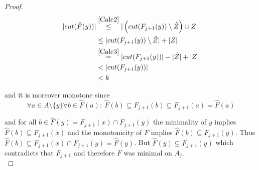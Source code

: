 \begin{proof}
    \begin{align*}
        |cut(\hat{F}(y))| &\overset{\cref*{Calc2}}{\leq} |\left(cut(F_{j+1}(y))\setminus \hat{Z}\right) \cup Z|\\
        &\leq |cut(F_{j+1}(y)) \setminus \hat{Z}| + |Z|\\
        &\overset{\cref*{Calc3}}{=} |cut(F_{j+1}(y))| - |\hat{Z}| + |Z|\\
        &< |cut(F_{j+1}(y))|\\
        &< k
    \end{align*}

    and it is moreover monotone since 
    $$\forall a \in A \setminus \{y\} \forall b \in \hat{F}(a): \ \hat{F}(b) \subseteq F_{j+1}(b) \subseteq F_{j+1}(a) = \hat{F}(a)$$
    
    and for all $b\in \hat{F}(y)=F_{j+1}(x)\cap F_{j+1}(y)$ the minimality of $y$ implies $\hat{F}(b) \subseteq F_{j+1}(x)$ and the monotonicity of $F$ implies $\hat{F}(b) \subseteq F_{j+1}(y)$. Thus $\hat{F}(b) \subseteq F_{j+1}(x)\cap F_{j+1}(y)=\hat{F}(y)$. But $\hat{F}(y)\subsetneq F_{j+1}(y)$ which contradicts that $F_{j+1}$ and therefore $F$ was minimal on $A_j$. \\


\end{proof}
